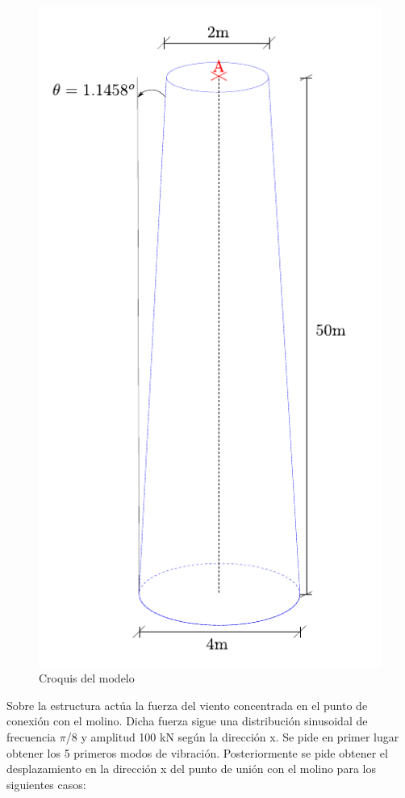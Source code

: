 \documentclass[spanish,a4paper,12pt]{article}
\begin{document}
\begin{figure}[hb]
\begin{minipage}[b]{0.35\linewidth}
\includegraphics[scale=0.8]{molino.pdf}
\caption{Croquis del modelo}
\label{fig:croquis}
\end{minipage}
\end{figure}

Sobre la estructura actúa la fuerza del viento concentrada en el punto de conexión con el molino. Dicha fuerza sigue una distribución sinusoidal de frecuencia $\pi$/8 y amplitud 100 kN según la dirección x.
\vspace{2mm}
Se pide en primer lugar obtener los 5 primeros modos de vibración. Posteriormente se pide obtener el desplazamiento en la dirección x del punto de unión con el molino para los siguientes casos:
\end{document}
